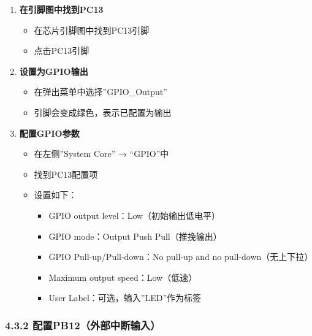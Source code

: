 \documentclass[
  chinese,
  UTF8,
  oneside,
  openany]{ctexbook}
\providecommand{\tightlist}{%
  \setlength{\itemsep}{0pt}\setlength{\parskip}{0pt}}
\begin{document}
\begin{enumerate}
\def\labelenumi{\arabic{enumi}.}
\tightlist
\item
  \textbf{在引脚图中找到PC13}

  \begin{itemize}
  \tightlist
  \item
    在芯片引脚图中找到PC13引脚
  \item
    点击PC13引脚
  \end{itemize}
\item
  \textbf{设置为GPIO输出}

  \begin{itemize}
  \tightlist
  \item
    在弹出菜单中选择''GPIO\_Output''
  \item
    引脚会变成绿色，表示已配置为输出
  \end{itemize}
\item
  \textbf{配置GPIO参数}

  \begin{itemize}
  \tightlist
  \item
    在左侧''System Core'' → ``GPIO''中
  \item
    找到PC13配置项
  \item
    设置如下：

    \begin{itemize}
    \tightlist
    \item
      GPIO output level：Low（初始输出低电平）
    \item
      GPIO mode：Output Push Pull（推挽输出）
    \item
      GPIO Pull-up/Pull-down：No pull-up and no pull-down（无上下拉）
    \item
      Maximum output speed：Low（低速）
    \item
      User Label：可选，输入''LED''作为标签
    \end{itemize}
  \end{itemize}
\end{enumerate}

\subsubsection{4.3.2
配置PB12（外部中断输入）}\label{ux914dux7f6epb12ux5916ux90e8ux4e2dux65adux8f93ux5165}
\end{document}
